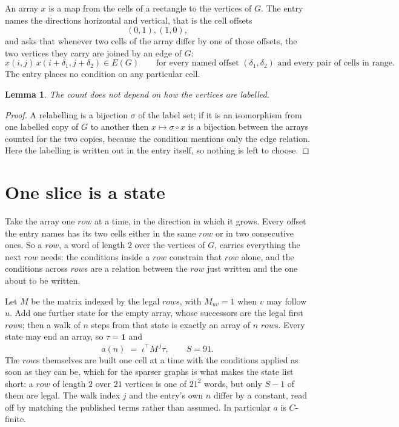 \documentclass[11pt,a4paper]{article}
\theoremstyle{plain}
\newtheorem{lemma}[theorem]{Lemma}
\theoremstyle{definition}
\begin{document}
An array $x$ is a map from the cells of a rectangle to the vertices of $G$. The entry names the
directions horizontal and vertical, that is the cell offsets
\[
(0,1), (1,0),
\]
and asks that whenever two cells of the array differ by one of those offsets, the two vertices
they carry are joined by an edge of $G$:
\[
x(i,j)\,x(i+\delta_1,j+\delta_2)\in E(G)\qquad
\text{for every named offset } (\delta_1,\delta_2)\text{ and every pair of cells in range.}
\]
The entry places no condition on any particular cell.

\begin{lemma}\label{lem:label}
The count does not depend on how the vertices are labelled.
\end{lemma}

\begin{proof}
A relabelling is a bijection $\sigma$ of the label set; if it is an isomorphism from one
labelled copy of $G$ to another then $x\mapsto\sigma\circ x$ is a bijection between the arrays
counted for the two copies, because the condition mentions only the edge relation.
Here the labelling is written out in the entry itself, so nothing is left to choose.
\end{proof}

\section{One slice is a state}

Take the array one $row$ at a time, in the direction in which it grows.
Every offset the entry names has its two cells either in the same $row$ or in two
consecutive ones. So a $row$, a word of length $2$ over the vertices of $G$, carries
everything the next $row$ needs: the conditions inside a $row$ constrain that
$row$ alone, and the conditions across $row$s are a relation between the
$row$ just written and the one about to be written.

Let $M$ be the matrix indexed by the legal $row$s, with $M_{uv}=1$ when $v$ may
follow $u$. Add one further state for the empty array, whose successors are the legal first
$row$s; then a walk of
$n$ steps from that state is exactly an array of $n$ $row$s. Every state may end an
array, so $\tau=\mathbf{1}$ and
\[
a(n)\;=\;\iota^{\!\top}M^{\,j}\tau ,\qquad S=91.
\]
The $row$s themselves are built one cell at a time with the conditions applied as soon
as they can be, which for the sparser graphs is what makes the state list short: a $row$
of length $2$ over $21$ vertices is one of $21^{2}$ words, but only $S-1$ of them are
legal. The walk index $j$ and the entry's own $n$ differ by a constant, read off by matching the
published terms rather than assumed. In particular $a$ is $C$-finite.
\end{document}
